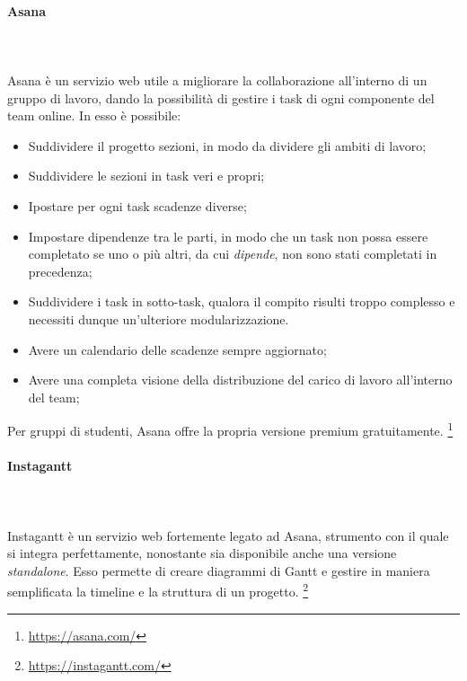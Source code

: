 \paragraph{Asana}
	~\\~\\Asana è un servizio web utile a migliorare la collaborazione all'interno di un gruppo di lavoro, dando la possibilità di gestire i task di ogni componente del team online. 
In esso è possibile:
\begin{itemize}
\item Suddividere il progetto sezioni, in modo da dividere gli ambiti di lavoro;
\item Suddividere le sezioni in task veri e propri;
\item Ipostare per ogni task scadenze diverse; 
\item Impostare dipendenze tra le parti, in modo che un task non possa essere completato se uno o più altri, da cui \emph{dipende}, non sono stati completati in precedenza;
\item Suddividere i task in sotto-task, qualora il compito risulti troppo complesso e necessiti dunque un'ulteriore modularizzazione.
\item Avere un calendario delle scadenze sempre aggiornato;
\item Avere una completa visione della distribuzione del carico di lavoro all'interno del team;
\end{itemize}
Per gruppi di studenti, Asana offre la propria versione premium gratuitamente.
	\footnote{\href{https://asana.com/}{https://asana.com/}}

\paragraph{Instagantt}
	~\\~\\Instagantt è un servizio web fortemente legato ad Asana, strumento con il quale si integra perfettamente, nonostante sia disponibile anche una versione \emph{standalone}. Esso permette di creare diagrammi di Gantt e gestire in maniera semplificata la timeline e la struttura di un progetto.
	\footnote{\href{https://instagantt.com/}{https://instagantt.com/}}


	